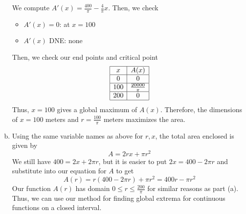 \documentclass[11pt]{exam}
\begin{document}
\begin{questions}
\begin{solution}
\begin{enumerate}[(a)]
    We compute \(A'(x) = \frac{400}{\pi}-\frac{4}{\pi}x\). Then, we check
    \begin{itemize}
    \item \(A'(x) = 0\): at \(x=100\)
    \item \(A'(x)\) DNE: none
    \end{itemize}
    Then, we check our end points and critical point \[
      \begin{array}{|c|c|}
        \hline
        x & A(x)\\
        \hline
        0 & 0\\
        \hline
        100 & \frac{20000}{\pi}\\
        \hline
        200 & 0\\
        \hline
      \end{array}
    \]
    Thus, \(x=100\) gives a global maximum of \(A(x)\). Therefore, the
    dimensions of \(x=100\) meters and \(r = \frac{100}{\pi}\) meters maximizes the area.
  \item Using the same variable names as above for \(r,x\), the total
    area enclosed is given by \[
      A = 2rx + \pi r^2
    \]
    We still have \(400 = 2x + 2\pi r\), but it is easier to put \(2x
    = 400 - 2\pi r\) and substitute into our equation for \(A\) to
    get \[
      A(r) = r(400-2\pi r) + \pi r^2 = 400r-\pi r^2
    \]
    Our function \(A(r)\) has domain \(0 \leq r \leq
    \frac{200}{\pi}\) for similar reasons as part (a). Thus, we can
    use our method for finding global extrema for continuous functions
    on a closed interval.


\end{enumerate}
\end{solution}
\end{questions}
\end{document}

